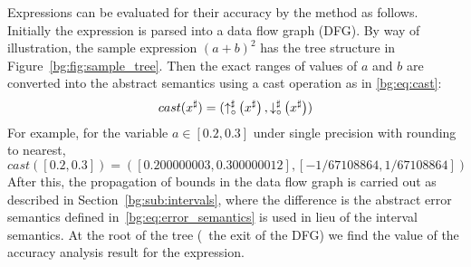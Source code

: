 Expressions can be evaluated for their accuracy by the method as follows.
Initially the expression is parsed into a data flow graph (DFG). By way of
illustration, the sample expression ${(a + b)}^2$ has the tree structure
in Figure~\ref{bg:fig:sample_tree}. Then the exact ranges of values of $a$ and
$b$ are converted into the abstract semantics using a cast operation as in
\eqref{bg:eq:cast}:
\begin{equation}
    cast(x^\sharp) = (\operatorname{\uparrow^\sharp_\circ}\left(x^\sharp\right), \operatorname{\downarrow^\sharp_\circ}\left(x^\sharp\right))
    \label{bg:eq:cast}
\end{equation}
For example, for the variable $a \in [0.2, 0.3]$ under single precision
with rounding to nearest,
\begin{equation}
    cast([0.2, 0.3]) = ([0.200000003, 0.300000012], [-1/67108864, 1/67108864])
\end{equation}
After this, the propagation of bounds in the data flow graph is carried out as
described in Section~\ref{bg:sub:intervals}, where the difference is the abstract
error semantics defined in~\eqref{bg:eq:error_semantics} is used in lieu of the
interval semantics. At the root of the tree (\ie~the exit of the DFG) we find
the value of the accuracy analysis result for the expression.
